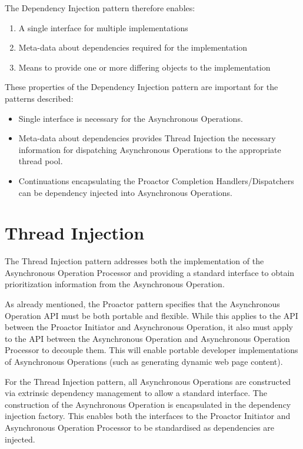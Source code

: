 \documentclass[prodmode]{style/acmlarge}
\begin{document}
The Dependency Injection pattern therefore enables:
\begin{enumerate}
  \item A single interface for multiple implementations
  \item Meta-data about dependencies required for the implementation
  \item Means to provide one or more differing objects to the implementation
\end{enumerate}

These properties of the Dependency Injection pattern are important for the
patterns described:
\begin{itemize}
  \item Single interface is necessary for the Asynchronous Operations.
  \item Meta-data about dependencies provides Thread Injection the necessary information for dispatching Asynchronous Operations to the appropriate thread pool.
  \item Continuations encapsulating the Proactor Completion Handlers/Dispatchers can be dependency injected into Asynchronous Operations.
\end{itemize}


\section{Thread Injection}

The Thread Injection pattern addresses both the implementation of the
Asynchronous Operation Processor and providing a standard interface to obtain
prioritization information from the Asynchronous Operation.

As already mentioned, the Proactor pattern specifies that the Asynchronous
Operation API must be both portable and flexible.  While this applies to the API
between the Proactor Initiator and Asynchronous Operation, it also must apply to
the API between the Asynchronous Operation and Asynchronous Operation Processor
to decouple them.  This will enable portable developer implementations of
Asynchronous Operations (such as generating dynamic web page content). 

For the Thread Injection pattern, all Asynchronous Operations are constructed
via extrinsic dependency management \cite{ioc} to allow a standard interface.
The construction of the Asynchronous Operation is encapsulated in the dependency
injection factory.  This enables both the interfaces to the Proactor Initiator
and Asynchronous Operation Processor to be standardised as dependencies are
injected.
\end{document}
